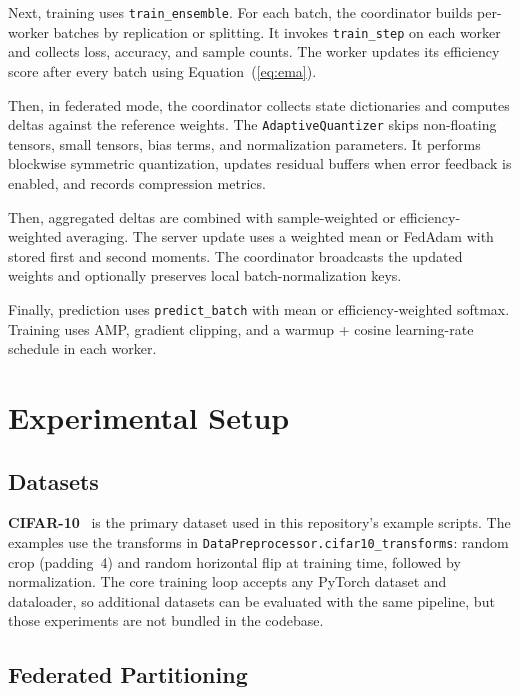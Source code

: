 \documentclass[journal,twoside]{IEEEtran}
\begin{document}
Next, training uses \texttt{train\_ensemble}. For each batch, the
coordinator builds per-worker batches by replication or splitting. It
invokes \texttt{train\_step} on each worker and collects loss, accuracy,
and sample counts. The worker updates its efficiency score after every
batch using Equation~(\ref{eq:ema}).

Then, in federated mode, the coordinator collects state dictionaries and
computes deltas against the reference weights. The
\texttt{AdaptiveQuantizer} skips non-floating tensors, small tensors,
bias terms, and normalization parameters. It performs blockwise
symmetric quantization, updates residual buffers when error feedback is
enabled, and records compression metrics.

Then, aggregated deltas are combined with sample-weighted or
efficiency-weighted averaging. The server update uses a weighted mean or
FedAdam with stored first and second moments. The coordinator broadcasts
the updated weights and optionally preserves local batch-normalization
keys.

Finally, prediction uses \texttt{predict\_batch} with mean or
efficiency-weighted softmax. Training uses AMP, gradient clipping, and a
warmup + cosine learning-rate schedule in each worker.

\section{Experimental Setup}
\label{sec:setup}

\subsection{Datasets}

\textbf{CIFAR-10}~\cite{krizhevsky2009} is the primary dataset used in
this repository's example scripts. The examples use the transforms in
\texttt{DataPreprocessor.cifar10\_transforms}: random crop (padding~4)
and random horizontal flip at training time, followed by normalization.
The core training loop accepts any PyTorch dataset and dataloader, so
additional datasets can be evaluated with the same pipeline, but those
experiments are not bundled in the codebase.

\subsection{Federated Partitioning}
\end{document}

